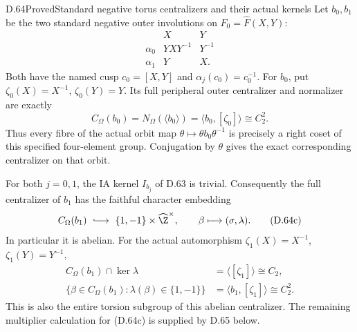 \begin{claim}{D.64}{Proved}{Standard negative torus centralizers and their actual kernels}
Let $b_0,b_1$ be the two standard negative outer
involutions on $F_0=\widehat F(X,Y)$:
\[
 \begin{array}{c|cc}
       &X&Y\\ \hline
 \alpha_0&YXY^{-1}&Y^{-1}\\
 \alpha_1&Y&X .
 \end{array}                                                  \tag{D.64a}
\]
Both have the named cusp $c_0=[X,Y]$ and
$\alpha_j(c_0)=c_0^{-1}$.
For $b_0$, put $\zeta_0(X)=X^{-1}$,
$\zeta_0(Y)=Y$.
Its full peripheral outer centralizer and normalizer
are exactly
\[
 C_\Omega(b_0)=N_\Omega(\langle b_0\rangle)
      =\langle b_0,[\zeta_0]\rangle\cong C_2^2.               \tag{D.64b}
\]
Thus every fibre of the actual orbit map
$\theta\mapsto\theta b_0\theta^{-1}$ is precisely
a right coset of this specified four-element group.
Conjugation by $\theta$ gives the exact corresponding
centralizer on that orbit.

For both $j=0,1$, the IA kernel $I_{b_j}$ of
D.63 is trivial. Consequently the full centralizer
of $b_1$ has the faithful character embedding
\[
 C_\Omega(b_1)\ \lhook\joinrel\longrightarrow\
          \{1,-1\}\times\widehat\Z^\times,\qquad
                         \beta\longmapsto(\sigma,\lambda).
                                                               \tag{D.64c}
\]
In particular it is abelian.
For the actual automorphism
$\zeta_1(X)=X^{-1}$, $\zeta_1(Y)=Y^{-1}$,
\[
 \begin{split}
 C_\Omega(b_1)\cap\ker\lambda&=\langle[\zeta_1]\rangle
                                                  \cong C_2,\\
 \{\beta\in C_\Omega(b_1):\lambda(\beta)\in\{1,-1\}\}
                   &=\langle b_1,[\zeta_1]\rangle\cong C_2^2.
 \end{split}                                                  \tag{D.64d}
\]
This is also the entire torsion subgroup of this
abelian centralizer. The remaining multiplier
calculation for (D.64c) is supplied by D.65 below.
\end{claim}


